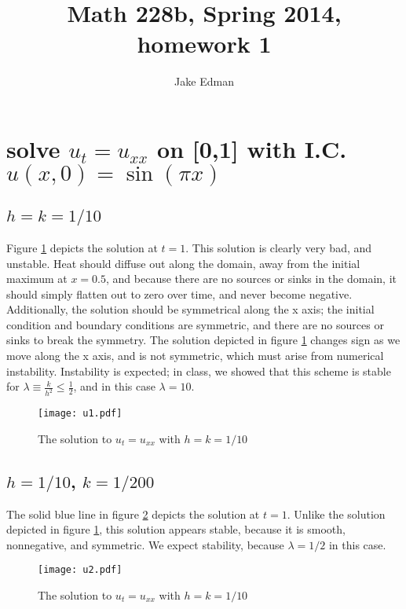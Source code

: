 \documentclass[11pt]{amsart}
\title{Math 228b, Spring 2014, homework 1}
\author{Jake Edman}
\date{}                                           %
\begin{document}
\maketitle
\section{solve $u_t = u_{xx}$ on [0,1] with I.C. $u(x,0)= \sin(\pi x)$}
\subsection{$h=k=1/10$}
Figure \ref{u1} depicts the solution at $t=1$.  This solution is clearly very bad, and unstable. Heat should diffuse out along the domain, away from the initial maximum at $x=0.5$, and because there are no sources or sinks in the domain, it should simply flatten out to zero over time, and never become negative.  Additionally, the solution should be symmetrical along the x axis; the initial condition and boundary conditions are symmetric, and there are no sources or sinks to break the symmetry. The solution depicted in figure \ref{u1} changes sign as we move along the x axis, and is not symmetric, which must arise from  numerical instability. Instability is expected; in class, we showed that this scheme is stable for $\lambda \equiv \frac{k}{h^2} \le \frac{1}{2}$, and in this case $\lambda = 10$. 

\begin{figure}[t]
\begin{center} 
\texttt{[image: u1.pdf]}
\caption{The solution to $u_t = u_{xx}$ with  $h=k=1/10$ }
\label{u1} 
\end{center}
\end{figure}
  
\subsection{$h=1/10$, $k=1/200$}
The solid blue line in figure \ref{u2} depicts the solution at $t=1$. Unlike the solution depicted in figure \ref{u1}, this solution appears stable, because it is smooth, nonnegative, and symmetric. We expect stability, because $\lambda = 1/2$ in this case. 

\begin{figure}[t]
\begin{center} 
\texttt{[image: u2.pdf]}
\caption{The solution to $u_t = u_{xx}$ with  $h=k=1/10$ }
\label{u2} 
\end{center}
\end{figure}
\end{document}
